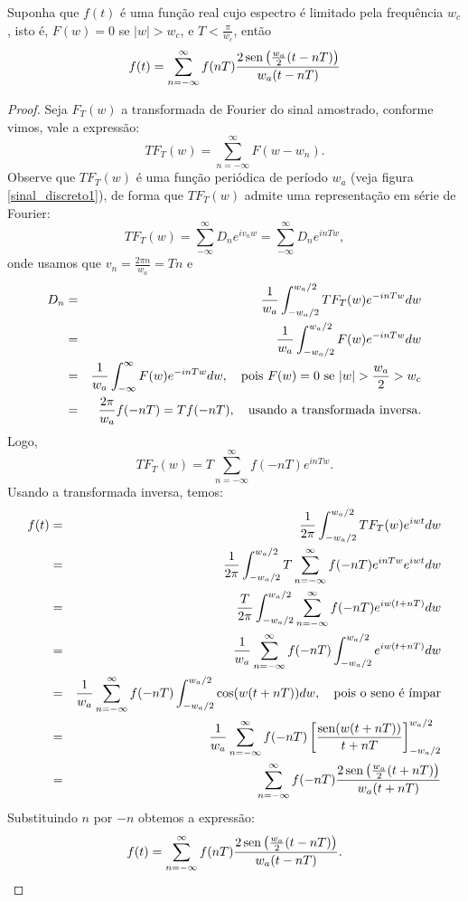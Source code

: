 \begin{teo} Suponha que $f(t)$ é uma função real cujo espectro é limitado pela frequência $w_c$, isto é, $F(w)=0$ se $|w|>w_c$, e $T<\frac{\pi}{w_c}$, então
$$
f(t)=\sum_{n=-\infty}^\infty f(nT) \frac{2\operatorname{sen}\left(\frac{w_a}{2}(t-nT)\right)}{w_a(t-nT)}
$$
\end{teo}
\begin{proof} Seja $F_T(w)$ a transformada de Fourier do sinal amostrado, conforme vimos, vale a expressão:
$$
TF_T(w)=\sum_{n=-\infty}^\infty F(w-w_n).
$$
Observe que $TF_T(w)$ é uma função periódica de período $w_a$ (veja figura \ref{sinal_discreto1}), de forma que $TF_T(w)$ admite uma representação em série de Fourier:
$$
TF_T(w)=\sum_{-\infty}^\infty D_n e^{iv_n w}=\sum_{-\infty}^\infty D_n e^{in Tw},
$$
onde usamos que $v_n=\frac{2\pi n}{w_a}=Tn$ e 
\begin{eqnarray*}
D_n&=&\frac{1}{w_a}\int_{-w_a/2}^{w_a/2}TF_T(w)e^{-in Tw}dw\\
&=&\frac{1}{w_a}\int_{-w_a/2}^{w_a/2}F(w)e^{-in Tw}dw\\
&=&\frac{1}{w_a}\int_{-\infty}^{\infty}F(w)e^{-in T w}dw,\quad \hbox{pois}\ F(w)=0\ \hbox{se}\ |w|>\frac{w_a}{2}>w_c\\
&=&\frac{2\pi}{w_a}f(-nT)=Tf(-nT),\quad \hbox{usando a transformada inversa}.
\end{eqnarray*}
Logo,
$$
TF_T(w)=T\sum_{n=-\infty}^\infty f(-nT) e^{in Tw}.
$$
Usando a transformada inversa, temos:
\begin{eqnarray*}
f(t)&=&\frac{1}{2\pi}\int_{-w_a/2}^{w_a/2}TF_T(w) e^{i w t}dw\\
&=&\frac{1}{2\pi}\int_{-w_a/2}^{w_a/2}T\sum_{n=-\infty}^\infty f(-nT) e^{in Tw} e^{i w t}dw\\
&=&\frac{T}{2\pi}\int_{-w_a/2}^{w_a/2}\sum_{n=-\infty}^\infty f(-nT) e^{iw(t+nT)} dw\\
&=&\frac{1}{w_a}\sum_{n=-\infty}^\infty f(-nT)\int_{-w_a/2}^{w_a/2}  e^{iw(t+nT)} dw\\
&=&\frac{1}{w_a}\sum_{n=-\infty}^\infty f(-nT)\int_{-w_a/2}^{w_a/2}  \cos(w(t+nT)) dw,\quad \hbox{pois o seno é ímpar}\\
&=&\frac{1}{w_a}\sum_{n=-\infty}^\infty f(-nT)\left[  \frac{\operatorname{sen}(w(t+nT))}{t+nT} \right]_{-w_a/2}^{w_a/2}\\
&=&\sum_{n=-\infty}^\infty f(-nT) \frac{2\operatorname{sen}\left(\frac{w_a}{2}(t+nT)\right)}{w_a(t+nT)} 
\end{eqnarray*}
Substituindo $n$ por $-n$ obtemos a expressão:
$$
f(t)=\sum_{n=-\infty}^\infty f(nT) \frac{2\operatorname{sen}\left(\frac{w_a}{2}(t-nT)\right)}{w_a(t-nT)}.
$$

\end{proof}
